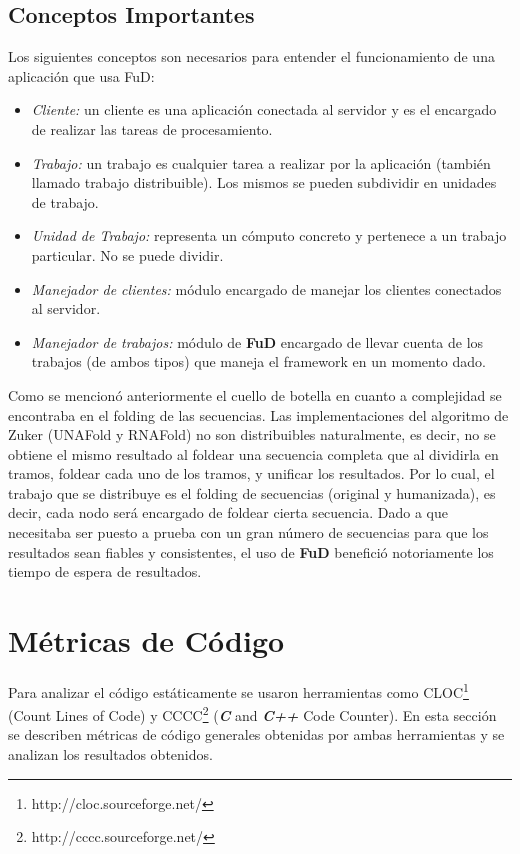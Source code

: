 \subsection{Conceptos Importantes}
Los siguientes conceptos son necesarios para entender el funcionamiento de una aplicación que usa FuD:
\begin{itemize}
	\item \emph{Cliente:} un cliente es una aplicación conectada al servidor y es el encargado de realizar las tareas de procesamiento.
 	\item \emph{Trabajo:} un trabajo es cualquier tarea a realizar por la aplicación (también llamado trabajo distribuible). Los mismos se
 						  pueden subdividir en unidades de trabajo.
 	\item \emph{Unidad de Trabajo:} representa un cómputo concreto y pertenece a un trabajo particular. No se puede dividir.
 	\item \emph{Manejador de clientes:} módulo encargado de manejar los clientes conectados al servidor.
 	\item \emph{Manejador de trabajos:} módulo de \textbf{FuD} encargado de llevar cuenta de los trabajos (de ambos tipos) que maneja el
 										framework en un momento dado.
 \end{itemize}

\par Como se mencionó anteriormente el cuello de botella en cuanto a complejidad se encontraba en el folding de las secuencias. Las implementaciones del algoritmo de Zuker (UNAFold y RNAFold) no son distribuibles naturalmente, es decir, no se obtiene el mismo resultado al foldear una secuencia completa que al dividirla en tramos, foldear cada uno de los tramos, y unificar los resultados. Por lo cual, el trabajo que se distribuye es el folding de secuencias (original y humanizada), es decir, cada nodo será encargado de foldear cierta secuencia. 
Dado a que \remo necesitaba ser puesto a prueba con un gran número de secuencias para que los resultados sean fiables y consistentes, el uso de \textbf{FuD} benefició notoriamente los tiempo de espera de resultados.

\section{Métricas de Código}
\par Para analizar el código estáticamente se usaron herramientas como CLOC\footnote{http://cloc.sourceforge.net/} (Count Lines of Code) y CCCC\footnote{http://cccc.sourceforge.net/} (\textbf{\textit{C}} and \textbf{\textit{C++}} Code Counter). En esta sección se describen métricas de código generales obtenidas por ambas herramientas y se analizan los resultados obtenidos.

